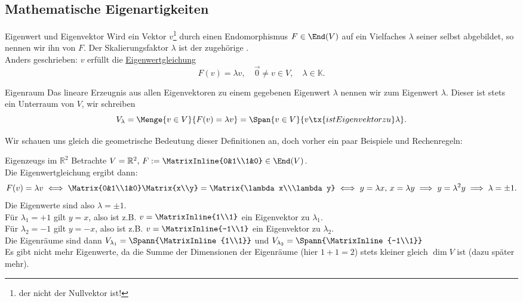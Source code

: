 \subsection{Mathematische Eigenartigkeiten}
\begin{Def}
{Eigenwert und Eigenvektor}
Wird ein Vektor $v$\footnote{der nicht der Nullvektor ist!} durch einen Endomorphismus $F\in\End(V)$ auf ein Vielfaches $\lambda$ seiner selbst abgebildet, so nennen wir ihn  von $F$. Der Skalierungsfaktor $\lambda$ ist der zugehörige .\\
Anders geschrieben: $v$ erfüllt die \underline{Eigenwertgleichung}
\begin{equation}
\boxed{F(v)=\lambda v}, \quad \Vec{0}\neq v\in V,\quad \lambda \in \mathbb{K}.
\end{equation}
\end{Def}

\begin{Def}
{Eigenraum}
Das lineare Erzeugnis aus allen Eigenvektoren zu einem gegebenen Eigenwert $\lambda$ nennen wir  zum Eigenwert $\lambda$. Dieser ist stets ein Unterraum von $V$, wir schreiben
\begin{equation}
V_\lambda=\Menge{v\in V}{F(v)=\lambda v}=\Span{v\in V}{v \tx{ ist Eigenvektor zu } \lambda}.
\end{equation}
\end{Def}

Wir schauen uns gleich die geometrische Bedeutung dieser Definitionen an, doch vorher ein paar Beispiele und Rechenregeln:
\begin{Beispiel}{Eigenzeugs im $\mathbb{R}^2$}
Betrachte $V=\mathbb{R}^2,\, F:=\MatrixInline{0&1\\1&0}\in \End(V)$.\\
Die Eigenwertgleichung ergibt dann:
\begin{equation*}
F(v)=\lambda v\iff \Matrix{0&1\\1&0}\Matrix{x\\y}=\Matrix{\lambda x\\\lambda y}\iff y =\lambda x,\, x=\lambda y\implies y=\lambda^2 y\implies \lambda=\pm 1.
\end{equation*}
Die Eigenwerte sind also $\lambda=\pm 1$.\\
Für $\lambda_1=+1$ gilt $y=x$, also ist z.B. $v=\MatrixInline{1\\1}$ ein Eigenvektor zu $\lambda_1$.\\
Für $\lambda_2=-1$ gilt $y=-x$, also ist z.B. $v=\MatrixInline{-1\\1}$ ein Eigenvektor zu $\lambda_2$.\\
Die Eigenräume sind dann $V_{\lambda_1}=\Spann{\MatrixInline{1\\1}}$ und $V_{\lambda_2}=\Spann{\MatrixInline{-1\\1}}$\\
Es gibt nicht mehr Eigenwerte, da die Summe der Dimensionen der Eigenräume (hier $1+1=2$) stets kleiner gleich $\dim V$ ist (dazu später mehr).
\end{Beispiel}


